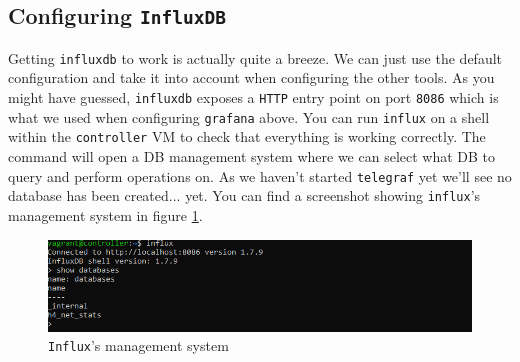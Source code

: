 \documentclass[12pt]{article}
\begin{document}
	\subsection{Configuring  \texttt{InfluxDB}}
		Getting \texttt{influxdb} to work is actually quite a breeze. We can just use the default configuration and take it into account when configuring the other tools. As you might have guessed, \texttt{influxdb} exposes a \texttt{HTTP} entry point on port \texttt{8086} which is what we used when configuring \texttt{grafana} above. You can run \texttt{influx} on a shell within the \texttt{controller} VM to check that everything is working correctly. The command will open a DB management system where we can select what DB to query and perform operations on. As we haven't started \texttt{telegraf} yet we'll see no database has been created... yet. You can find a screenshot showing \texttt{influx}'s management system in figure \ref{f:influx}.

		\begin{figure}
			\centering
			\includegraphics[width=\linewidth]{influx.png}
			\caption{\texttt{Influx}'s management system}
			\label{f:influx}
		\end{figure}
\end{document}
